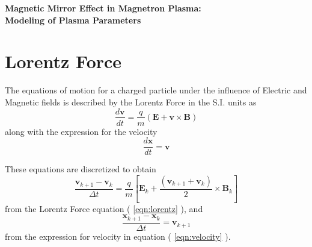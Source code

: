 \documentclass[12pt]{article}
\begin{document}
	{\selectfont 
		\begin{center}
			\Large{\textbf{Magnetic Mirror Effect in Magnetron Plasma:}} \\
			\Large{\textbf{Modeling of Plasma Parameters}} \\
		\end{center}
		
		\section{Lorentz Force}
		The equations of motion for a charged particle under the influence of Electric and Magnetic fields is described by the Lorentz Force in the S.I. units as
		\begin{equation}
			\label{eqn:lorentz}
			\frac{d \textbf{v}}{d t} = \frac{q}{m} \left(\textbf{E} + \textbf{v} \times \textbf{B} \right)
		\end{equation}
		along with the expression for the velocity
		\begin{equation}
			\label{eqn:velocity}
			\frac{d \textbf{x}}{d t} = \textbf{v}
		\end{equation} 
	
		\noindent These equations are discretized to obtain
		\begin{equation}
			\label{eqn:Dlorentz}
			\frac{\textbf{v}_{k+1} - \textbf{v}_{k}}{\Delta t} = \frac{q}{m} \left[\textbf{E}_{k} + \frac{\left( \textbf{v}_{k+1} + \textbf{v}_{k} \right) }{2} \times \textbf{B}_{k} \right] 
		\end{equation}
		from the Lorentz Force equation ( \ref{eqn:lorentz} ), and
		\begin{equation}
			\label{eqn:Dvelocity}
			\frac{\textbf{x}_{k+1} - \textbf{x}_{k} }{\Delta t} =	\textbf{v}_{k+1}
		\end{equation}
		from the expression for velocity in equation ( \ref{eqn:velocity} ).

	
}
\end{document}
